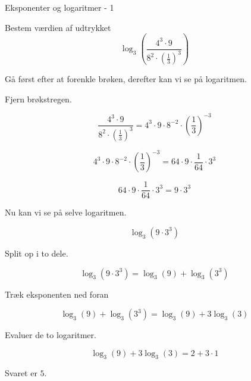 \documentclass{article}
\begin{document}
\tableofcontents
\newpage

\begin{exercise}{Eksponenter og logaritmer - 1}

Bestem værdien af udtrykket
\[
\log_3\left( \frac{4^3 \cdot 9}{8^2 \cdot \left(\frac{1}{3}\right)^3} \right)
\]


\hint
Gå først efter at forenkle brøken, derefter kan vi se på logaritmen.

\hint
Fjern brøkstregen.

\hint
\[
\frac{4^3 \cdot 9}{8^2 \cdot \left(\frac{1}{3}\right)^3}
 = 4^3 \cdot 9 \cdot 8^{-2} \cdot \left(\frac{1}{3}\right)^{-3}
\]

\hint
\[
4^3 \cdot 9 \cdot 8^{-2} \cdot \left(\frac{1}{3}\right)^{-3}
 = 64 \cdot 9 \cdot \frac{1}{64} \cdot 3^3
\]

\hint
\[
64 \cdot 9 \cdot \frac{1}{64} \cdot 3^3
 = 9 \cdot 3^3
\]

\hint
Nu kan vi se på selve logaritmen.

\hint
\[
\log_3\left(9 \cdot 3^3\right)
\]

\hint
Split op i to dele.

\hint
\[
\log_3\left(9 \cdot 3^3\right) = \log_3(9) + \log_3\left(3^3\right)
\]

\hint
Træk eksponenten ned foran

\hint
\[
\log_3(9) + \log_3\left(3^3\right) = \log_3(9) + 3\log_3(3)
\]

\hint
Evaluer de to logaritmer.

\hint
\[
\log_3(9) + 3\log_3(3) = 2 + 3 \cdot 1
\]

\hint
Svaret er $5$.

\end{exercise}

\newpage
\end{document}
